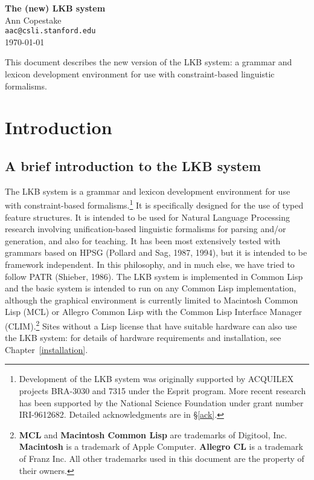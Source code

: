 \documentclass[12pt]{report}
\begin{document}
\begin{center}
{\Huge\bf The (new) LKB system}\\[0.2in]
{\LARGE Ann Copestake}\\
{\tt aac@csli.stanford.edu}\\
\today
\end{center}
This document describes the new version of the LKB system:
a grammar and lexicon development environment for use with
constraint-based linguistic formalisms.

\tableofcontents

\chapter{Introduction}

\section{A brief introduction to the LKB system}

The LKB system is a grammar and lexicon development environment for use with
constraint-based formalisms.\footnote{Development 
of the LKB system was originally supported by ACQUILEX projects
BRA-3030 and 7315 under the Esprit program.  More recent research
has been supported by the
National Science Foundation under grant number IRI-9612682.
Detailed acknowledgments are in \S\ref{ack}.}
It is specifically designed for the use of typed
feature structures.  It is intended to be used for Natural Language Processing
research involving unification-based linguistic formalisms for parsing and/or
generation, and also for teaching.  It has been most extensively tested with
grammars based on HPSG (Pollard and Sag, 1987, 1994), but it is intended to be
framework independent.  In this philosophy, and in much else, 
we have tried to follow PATR
(Shieber, 1986).  The LKB system is implemented in Common Lisp and the
basic system is intended to 
run on any Common Lisp implementation, although the
graphical environment is currently limited to Macintosh Common Lisp (MCL)
or Allegro Common Lisp with the Common Lisp Interface
Manager (CLIM).\footnote{{\bf MCL} and 
{\bf Macintosh Common Lisp} are trademarks of Digitool, Inc.
{\bf Macintosh} is a trademark of Apple Computer.
{\bf Allegro CL} is a trademark of Franz Inc.
All other trademarks used in this document are the property of their
owners.}
Sites without a Lisp license that have suitable hardware can 
also use the LKB system:
for details of hardware requirements and installation, 
see Chapter~\ref{installation}.
\end{document}
